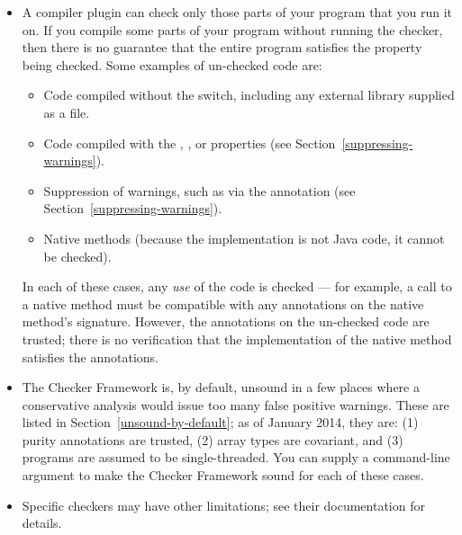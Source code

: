 \begin{itemize}

\item
  A compiler plugin can check only those parts of your program that you run
  it on.  If you compile some parts of your program without running the
  checker, then there is no guarantee that the entire program satisfies the
  property being checked.  Some examples of un-checked code are:

  \begin{itemize}
  \item
    Code compiled without the  switch, including any
    external library supplied as a  file.
  \item
    Code compiled with the , ,  or 
    properties (see Section~\ref{suppressing-warnings}).
  \item
    Suppression of warnings, such as via the 
    annotation (see Section~\ref{suppressing-warnings}).
  \item
    Native methods (because the implementation is not Java code, it cannot
    be checked).
  \end{itemize}

  In each of these cases, any \emph{use} of the code is checked --- for
  example, a call to a native method must be compatible with any
  annotations on the native method's signature.
  However, the annotations on the un-checked code are trusted; there is no
  verification that the implementation of the native method satisfies the
  annotations.

\item
  The Checker Framework is, by default, unsound in a few places where a
  conservative analysis would issue too many false positive warnings.
  These are listed in Section~\ref{unsound-by-default}; as of January 2014,
  they are: (1) purity annotations are trusted, (2) array types are
  covariant, and (3) programs are assumed to be single-threaded.
  You can supply a command-line argument to make the Checker Framework
  sound for each of these cases.


\item
  Specific checkers may have other limitations; see their documentation for
  details.

\end{itemize}


